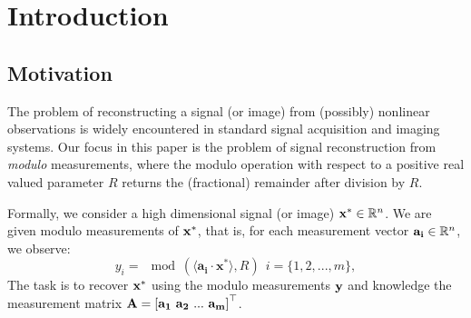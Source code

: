 \section{Introduction}
\label{sec:intro}
\subsection{Motivation}
\label{subsec:motivation}
The problem of reconstructing a signal (or image) from (possibly) nonlinear observations is widely encountered in standard signal acquisition and imaging systems. Our focus in this paper is the problem of signal reconstruction from \textit{modulo} measurements, where the modulo operation with respect to a positive real valued parameter $R$ returns the (fractional) remainder after division by $R$. %


Formally, we consider a high dimensional signal (or image) $\mathbf{x}^* \in {\mathbb{R}}^n$. We are given modulo measurements of $\mathbf{x^*}$, that is, for each measurement vector $\mathbf{a_i} \in {\mathbb{R}}^n$, we observe:
\begin{equation}
y_i=\mod(\langle \mathbf{a_i} \cdot \mathbf{x^*} \rangle,R)~~i = \{1,2,...,m\}, %
\label{eq:modmeas0}
\end{equation} 
The task is to recover $\mathbf{x^*}$ using the modulo measurements $\mathbf{y}$ and knowledge the measurement matrix $\mathbf{A} = \left[\mathbf{a_1~a_2~...~a_m}\right]^\top$. %


